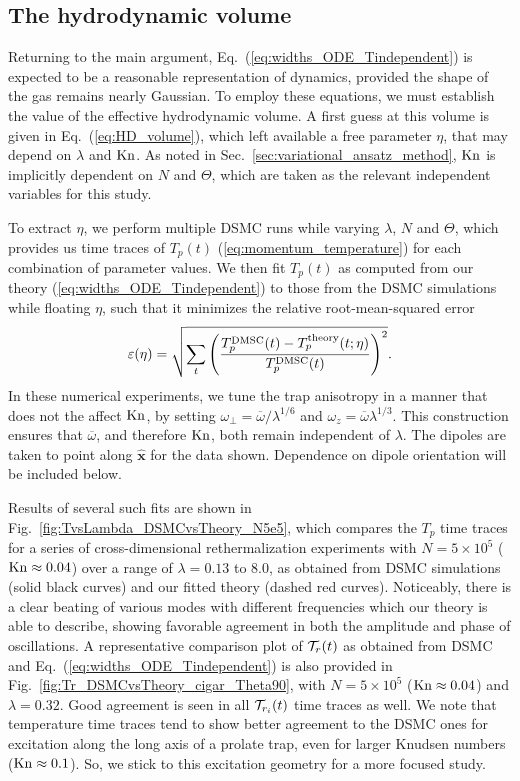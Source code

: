 \documentclass[reprint, amsmath, amssymb, aps, superscriptaddress]{revtex4-1}
\begin{document}
\subsection{ The hydrodynamic volume \label{sec:hydrodynamic_volume} }


Returning to the main argument, Eq.~(\ref{eq:widths_ODE_Tindependent}) is expected to be a reasonable representation of dynamics, provided the shape of the gas remains nearly Gaussian.  To employ these equations, we must establish the value of the effective hydrodynamic volume.  A first guess at this volume is given in Eq.~(\ref{eq:HD_volume}), which left available a free parameter $\eta$, that may depend on $\lambda$ and ${\rm Kn}$. As noted in Sec.~\ref{sec:variational_ansatz_method}, ${\rm Kn}$ is implicitly dependent on $N$ and $\Theta$, which are taken as the relevant independent variables for this study. 

 
To extract $\eta$, we perform multiple DSMC runs while varying $\lambda$, $N$ and $\Theta$, which provides us time traces of $T_p(t)$ (\ref{eq:momentum_temperature}) for each combination of parameter values. We then fit $T_p(t)$ as computed from our theory (\ref{eq:widths_ODE_Tindependent}) to those from the DSMC simulations while floating $\eta$, 
such that it minimizes the relative root-mean-squared error  
\begin{align} \label{eq:rms_error}
    \varepsilon( \eta )
    =
    \sqrt{
    \sum_t
    \left(
    \frac{ T_p^{\rm DMSC}(t) - T_p^{\rm theory}(t; \eta) }{ T_p^{\rm DMSC}(t) }
    \right)^2
    }.
\end{align} 
In these numerical experiments, we tune the trap anisotropy in a manner that does not the affect ${\rm Kn}$, by setting $\omega_{\perp} = \overline{\omega} / \lambda^{1/6}$ and $\omega_{z} = \overline{\omega} \lambda^{1/3}$. This construction ensures that $\overline{\omega}$, and therefore ${\rm Kn}$, both remain independent of $\lambda$.  
The dipoles are taken to point along $\hat{\boldsymbol{x}}$ for the data shown.  Dependence on dipole orientation will be included below.

Results of several such  fits are shown in Fig.~\ref{fig:TvsLambda_DSMCvsTheory_N5e5}, which compares the $T_p$ time traces for a series of cross-dimensional rethermalization experiments with $N = 5 \times 10^5$ (${\rm Kn} \approx 0.04$) over a range of $\lambda = 0.13$ to $8.0$, as obtained from DSMC simulations (solid black curves) and our fitted theory (dashed red curves). Noticeably, there is a clear beating of various modes with different frequencies which our theory is able to describe, showing favorable agreement in both the amplitude and phase of oscillations. 
A representative comparison plot of ${\cal T}_r(t)$ as obtained from DSMC and Eq.~(\ref{eq:widths_ODE_Tindependent}) is also provided in Fig.~\ref{fig:Tr_DSMCvsTheory_cigar_Theta90}, with $N = 5 \times 10^5$ (${\rm Kn} \approx 0.04$) and $\lambda = 0.32$. Good agreement is seen in all ${\cal T}_{r_i}(t)$ time traces as well. 
We note that temperature time traces tend to show better agreement to the DSMC ones for excitation along the long axis of a prolate trap, even for larger Knudsen numbers (${\rm Kn} \approx 0.1$). So, we stick to this excitation geometry for a more focused study. 
\end{document}
